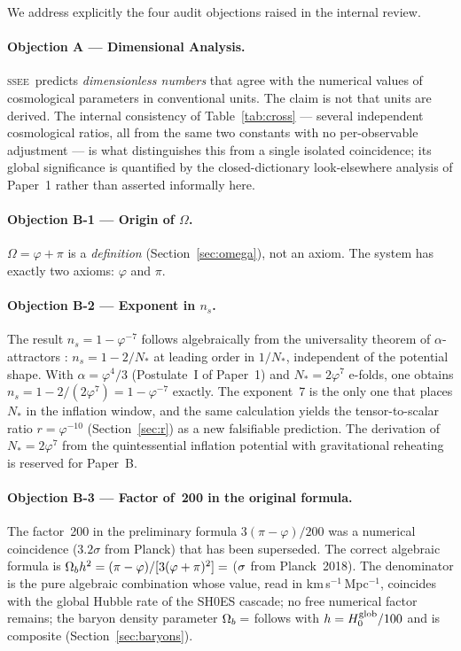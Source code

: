 \documentclass[12pt,a4paper]{article}
\newcommand{\SSEE}{\ifmmode\mathrm{SSEE}\else\textsc{ssee}\fi}
\begin{document}
We address explicitly the four audit objections raised in the internal review.

\paragraph{Objection A — Dimensional Analysis.}
\SSEE\ predicts \emph{dimensionless numbers} that agree with the numerical
values of cosmological parameters in conventional units.
The claim is not that units are derived.
The internal consistency of Table~\ref{tab:cross} — several independent
cosmological ratios, all from the same two constants with no per-observable
adjustment — is what distinguishes this from a single isolated coincidence;
its global significance is quantified by the closed-dictionary look-elsewhere
analysis of Paper~1 rather than asserted informally here.

\paragraph{Objection B-1 — Origin of $\Omega$.}
$\Omega = \varphi+\pi$ is a \emph{definition} (Section~\ref{sec:omega}),
not an axiom.  The system has exactly two axioms: $\varphi$ and $\pi$.

\paragraph{Objection B-2 — Exponent in $n_s$.}
The result $n_s = 1-\varphi^{-7}$ follows algebraically from the universality
theorem of $\alpha$-attractors \citep{Kallosh2013}: $n_s = 1-2/N_*$ at
leading order in $1/N_*$, independent of the potential shape.
With $\alpha = \varphi^4/3$ (Postulate~I of Paper~1) and $N_* = 2\varphi^7$
e-folds, one obtains $n_s = 1-2/(2\varphi^7) = 1-\varphi^{-7}$ exactly.
The exponent~7 is the only one that places $N_*$ in the inflation window,
and the same calculation yields the tensor-to-scalar ratio $r = \varphi^{-10}$
(Section~\ref{sec:r}) as a new falsifiable prediction.
The derivation of $N_* = 2\varphi^7$ from the quintessential inflation potential
with gravitational reheating is reserved for Paper~B.

\paragraph{Objection B-3 — Factor of~200 in the original formula.}
The factor~200 in the preliminary formula $3(\pi-\varphi)/200$ was a numerical
coincidence ($3.2\sigma$ from Planck) that has been superseded.
The correct algebraic formula is $\Omega_b h^2 = (\pi-\varphi)/[3(\varphi+\pi)^2] = \val{OMEGA_B_H2_d6}$ ($\val{wb_planck_sig}\sigma$ from Planck~2018).
The denominator is the pure algebraic combination whose value, read in
km\,s$^{-1}$\,Mpc$^{-1}$, coincides with the global Hubble rate of the SH0ES cascade; no free numerical factor
remains; the baryon density parameter $\Omega_b = \val{Omega_b_alg_d4}$ follows with
$h=H_0^{\rm glob}/100$ and is composite (Section~\ref{sec:baryons}).
\end{document}
